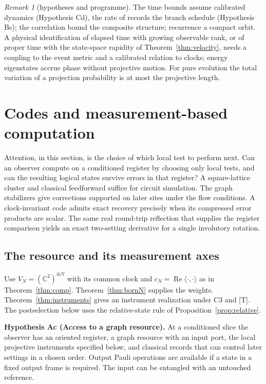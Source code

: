\documentclass[aps,pra,onecolumn,superscriptaddress,nofootinbib,10pt]{revtex4-2}
\theoremstyle{definition}
\theoremstyle{remark}
\newtheorem{remark}[theorem]{Remark}
\begin{document}
\begin{remark}[hypotheses and programme]\label{rem:bdprogramme}
The time bounds assume calibrated dynamics (Hypothesis Cd), the rate of records the branch schedule
(Hypothesis Bs); the correlation bound the composite structure; recurrence a compact orbit.  A physical
identification of elapsed time with growing observable rank, or of proper time with the state-space
rapidity of Theorem~\ref{thm:velocity}, needs a coupling to the event metric and a calibrated relation to
clocks; energy eigenstates accrue phase without projective motion.  For pure evolution the total
variation of a projection probability is at most the projective length.
\end{remark}



\section{Codes and measurement-based computation}\label{sec:attention}

Attention, in this section, is the choice of which local test to perform next.  Can an observer compute on a conditioned register by choosing only local tests, and can the resulting logical states survive errors in that register? A square-lattice cluster and classical feedforward suffice for circuit simulation. The graph stabilizers give corrections supported on later sites under the flow conditions. A clock-invariant code admits exact recovery precisely when its compressed error products are scalar. The same real round-trip reflection that supplies the register comparison yields an exact two-setting derivative for a single involutory rotation.

\subsection{The resource and its measurement axes}

Use $V_N=(\mathbb C^2)^{\otimes N}$ with its common clock and $c_N=\operatorname{Re}\langle\cdot,\cdot\rangle$ as in Theorem~\ref{thm:comp}. Theorem~\ref{thm:bornN} supplies the weights. Theorem~\ref{thm:instruments} gives an instrument realization under C3 and [T]. The postselection below uses the relative-state rule of Proposition~\ref{prop:relative}.

\smallskip\noindent\textbf{Hypothesis Ac (Access to a graph resource).}\label{hyp:Ac}  At a conditioned slice the observer has an oriented register, a graph resource with an input port, the local projective instruments specified below, and classical records that can control later settings in a chosen order. Output Pauli operations are available if a state in a fixed output frame is required. The input can be entangled with an untouched reference.
\end{document}
